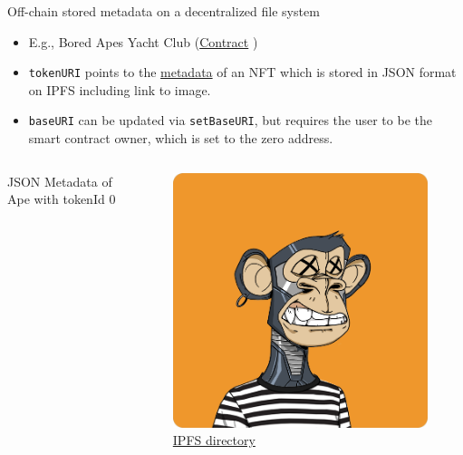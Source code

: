 \documentclass[handout]{beamer}
\begin{document}
\begin{frame}{Off-chain stored metadata on a decentralized file system}
	\begin{itemize}
		\item E.g., Bored Apes Yacht Club (\href{https://etherscan.io/address/0xbc4ca0eda7647a8ab7c2061c2e118a18a936f13d}{Contract} \link)
		\item \texttt{tokenURI} points to the \href{ipfs://QmeSjSinHpPnmXmspMjwiXyN6zS4E9zccariGR3jxcaWtq/1}{metadata} \link of an NFT which is stored in JSON format on IPFS including link to image.
		\item \texttt{baseURI} can be updated via \texttt{setBaseURI}, but requires the user to be the smart contract owner, which is set to the zero address.
	\end{itemize} 
	\begin{columns}[T]
		\begin{column}{0.67\textwidth}
		\vspace{-1em}
			\begin{samplecode}{JSON Metadata of Ape with tokenId 0}
				
			\end{samplecode}		
		\end{column}
		\begin{column}{0.35\textwidth}
			\begin{figure}
				\vspace{-1em}
				\centering
				\includegraphics[scale=0.18]{../assets/images/ape_0.png}
				\caption*{\link \href{https://bafybeibnzhc7vp4hnfcocw7s2jej2tj5xqpwseyz3ifylismh47cr45rhm.ipfs.dweb.link/}{IPFS directory}}	
			\end{figure}
		\end{column}
	\end{columns}
\end{frame}
\end{document}
